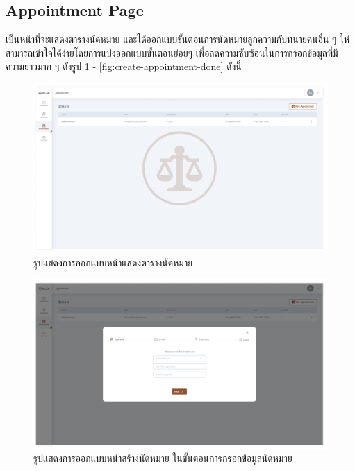 \documentclass[12pt,oneside,openright,a4paper]{cpe-thai-project}
\begin{document}
\subsection{Appointment Page}
\hspace*{1cm} เป็นหน้าที่จะแสดงตารางนัดหมาย และได้ออกแบบขั้นตอนการนัดหมายลูกความกับทนายคนอื่น ๆ ให้สามารถเข้าใจได้ง่ายโดยการแบ่งออกแบบขั้นตอนย่อยๆ เพื่อลดความซับซ้อนในการกรอกข้อมูลที่มีความยาวมาก ๆ ดังรูป \ref{fig:appointment} - \ref{fig:create-appointment-done} ดังนี้
\begin{figure}[!h]\centering
  \includegraphics[width=16cm]{./assets/userinterface/appointment.png}
  \caption{รูปแสดงการออกแบบหน้าแสดงตารางนัดหมาย}\label{fig:appointment}
\end{figure}

\clearpage

\begin{figure}[!h]\centering
  \includegraphics[width=16cm]{./assets/userinterface/create-appointment-info.png}
  \caption{รูปแสดงการออกแบบหน้าสร้างนัดหมาย ในขั้นตอนการกรอกข้อมูลนัดหมาย}\label{fig:create-appointment-info}
\end{figure}
\end{document}
